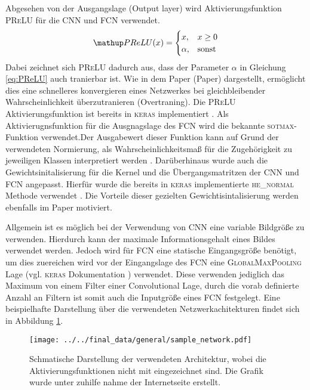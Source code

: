 Abgesehen von der Ausgangslage (Output layer) wird Aktivierungsfunktion
\textsc{PReLU} für die CNN und FCN verwendet.
\begin{equation}
  \label{eq:PReLU}
  \map{PReLU}(x)= \begin{cases} x,      & x \ge 0\\
                                \alpha, & \mathrm{sonst}
                  \end{cases}
\end{equation}
Dabei zeichnet sich \textsc{PReLU} dadurch aus, dass der Parameter $\alpha$ in
Gleichung \eqref{eq:PReLU} auch tranierbar ist. Wie in dem Paper (Paper) \cite{he_normal_PReLU}
dargestellt, ermöglicht dies eine schnelleres konvergieren eines Netzwerkes
bei gleichbleibender Wahrscheinlichkeit überzutranieren (Overtraning).
Die \textsc{PReLU} Aktivierungsfunktion ist bereits in \textsc{keras}
implementiert \cite{keras_prelu}. Als Aktivierugnsfunktion für die Ausgnagslage
des FCN wird die bekannte \textsc{sotmax}-Funktion verwendet.Der Ausgabewert dieser
Funktion kann auf Grund der verwendeten Normierung, als Wahrscheinlichkeitsmaß
für die Zugehörigkeit zu jeweiligen Klassen interpretiert werden \cite[S. 139]{hands_on_machine_learning}.
Darüberhinaus wurde auch die Gewichtsinitalisierung für die Kernel und
die Übergangsmatritzen der CNN und FCN angepasst. Hierfür wurde die
bereits in \textsc{keras} implementierte \textsc{he\_normal} Methode
verwendet \cite{keras_he_normal}. Die Vorteile dieser gezielten
Gewichtisintalisierung werden ebenfalls im Paper \cite{he_normal_PReLU} motiviert.

Allgemein ist es möglich bei der Verwendung von CNN eine variable Bildgröße
zu verwenden. Hierdurch kann der maximale Informationsgehalt eines Bildes
verwendet werden. Jedoch wird für FCN eine statische Eingangsgröße benötigt,
um dies zuereichen wird vor der Eingangslage des FCN eine \textsc{GlobalMaxPooling}
Lage (vgl. \textsc{keras} Dokumentation \cite{keras_max_pooling}) verwendet.
Diese verwenden jediglich das Maximum von einem Filter einer Convolutional Lage,
durch die vorab definierte Anzahl an Filtern ist somit auch die Inputgröße eines
FCN festgelegt.
Eine beispielhafte Darstellung über die verwendeten Netzwerkachitekturen findet sich
in Abbildung \ref{fig:beispielhafte_netz_architecture}.
\begin{figure}
\centering
\texttt{[image: ../../final\_data/general/sample\_network.pdf]}
\caption{Schmatische Darstellung der verwendeten Architektur, wobei
         die Aktivierungsfunktionen nicht mit eingezeichnet sind.
         Die Grafik wurde unter zuhilfe nahme der Internetseite \cite{net_svg_source} erstellt.}
\label{fig:beispielhafte_netz_architecture}
\end{figure}


